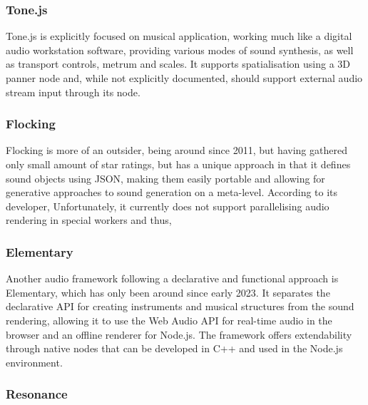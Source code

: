 \subsubsection{Tone.js}

Tone.js is explicitly focused on musical application, working much like a digital audio workstation software, providing various modes of sound synthesis, as well as transport controls, metrum and scales. It supports spatialisation using a \ac{3D} panner node and, while not explicitly documented, should support external audio stream input through its  node.

\subsubsection{Flocking}

Flocking is more of an outsider, being around since 2011, but having gathered only small amount of star ratings, but has a unique approach in that it defines sound objects using \ac{JSON}, making them easily portable and allowing for generative approaches to sound generation on a meta-level. According to its developer,  Unfortunately, it currently does not support parallelising audio rendering in special workers and thus, 

\subsubsection{Elementary}

Another audio framework following a declarative and functional approach is Elementary, which has only been around since early 2023. It separates the declarative \ac{API} for creating instruments and musical structures from the sound rendering, allowing it to use the Web Audio \ac{API} for real-time audio in the browser and an offline renderer for Node.js. The framework offers extendability through native nodes that can be developed in C++ and used in the Node.js environment.

\subsubsection{Resonance}

